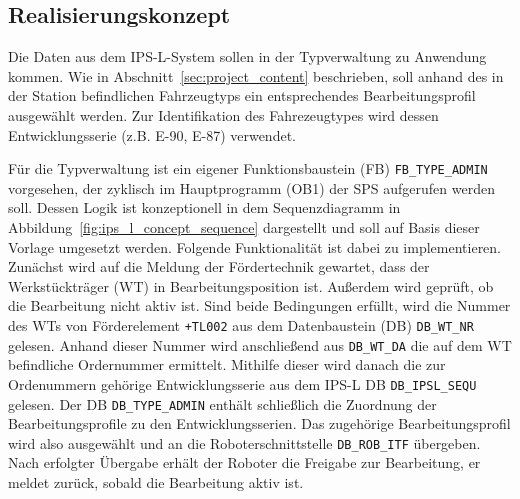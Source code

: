 \subsection{Realisierungskonzept}
\label{subsec:ips_l_concept}

Die Daten aus dem IPS-L-System sollen in der Typverwaltung zu Anwendung kommen. Wie in Abschnitt~\ref{sec:project_content} beschrieben, soll anhand des in der Station befindlichen Fahrzeugtyps ein entsprechendes Bearbeitungsprofil ausgewählt werden. Zur Identifikation des Fahrezeugtypes wird dessen Entwicklungsserie (z.B. E-90, E-87) verwendet.


Für die Typverwaltung ist ein eigener Funktionsbaustein (FB) \texttt{FB\_TYPE\_ADMIN} vorgesehen, der zyklisch im Hauptprogramm (OB1) der SPS aufgerufen werden soll. Dessen Logik ist konzeptionell in dem Sequenzdiagramm in Abbildung~\ref{fig:ips_l_concept_sequence} dargestellt und soll auf Basis dieser Vorlage umgesetzt werden. Folgende Funktionalität ist dabei zu implementieren. 
Zunächst wird auf die Meldung der Fördertechnik gewartet, dass der Werkstückträger (WT) in Bearbeitungsposition ist. Außerdem wird geprüft, ob die Bearbeitung nicht aktiv ist. Sind beide Bedingungen erfüllt, wird die Nummer des WTs von Förderelement \texttt{+TL002} aus dem Datenbaustein (DB) \texttt{DB\_WT\_NR} gelesen. Anhand dieser Nummer wird anschließend aus \texttt{DB\_WT\_DA} die auf dem WT befindliche Ordernummer ermittelt. Mithilfe dieser wird danach die zur Ordenummern gehörige Entwicklungsserie aus dem IPS-L DB \texttt{DB\_IPSL\_SEQU} gelesen. Der DB \texttt{DB\_TYPE\_ADMIN} enthält schließlich die Zuordnung der Bearbeitungsprofile zu den Entwicklungsserien. Das zugehörige Bearbeitungsprofil wird also ausgewählt und an die Roboterschnittstelle \texttt{DB\_ROB\_ITF} übergeben. Nach erfolgter Übergabe erhält der Roboter die Freigabe zur Bearbeitung, er meldet zurück, sobald die Bearbeitung aktiv ist. 




